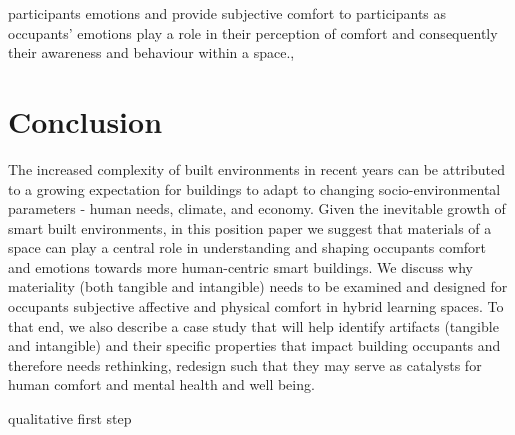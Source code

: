 \documentclass[acmconf, anonymous, review]{acmart}
\begin{document}
participants emotions and provide subjective comfort to participants as occupants' emotions play a role in their perception of comfort and consequently their awareness and behaviour within a space.,










\section{Conclusion}
The increased complexity of built environments in recent years can be attributed to a growing expectation for buildings to adapt to changing socio-environmental parameters - human needs, climate, and economy. Given the inevitable growth of smart built environments, in this position paper we suggest that materials of a space can play a central role in understanding and shaping occupants comfort and emotions towards more human-centric smart buildings. We discuss why materiality (both tangible and intangible) needs to be examined and designed for occupants subjective affective and physical comfort in hybrid learning spaces. To that end, we also describe a case study that will help identify artifacts (tangible and intangible) and their specific properties that impact building occupants and therefore needs rethinking, redesign such that they may serve as catalysts for human comfort and mental health and well being. 

qualitative first step




\end{document}
